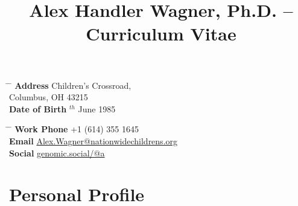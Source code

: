 \documentclass[10pt]{article} %
\begin{document}

\title{Alex Handler Wagner, Ph.D. -- Curriculum Vitae} %


\parbox{0.5\textwidth}{ %
\begin{tabbing} %
\hspace{3cm} \= \hspace{4cm} \= \kill %
{\bf Address}  Children's Crossroad,\\ %
\> Columbus, OH 43215 \\ %
{\bf Date of Birth} $^{th}$ June 1985 %
\end{tabbing}}
\hfill %
\parbox{0.5\textwidth}{ %
\begin{tabbing} %
\hspace{3cm} \= \hspace{4cm} \= \kill %
{\bf Work Phone} \> +1 (614) 355 1645 \\ %
{\bf Email} \> \href{mailto:Alex.Wagner@nationwidechildrens.org}{Alex.Wagner@nationwidechildrens.org} \\ %
{\bf Social} \> \href{https://genomic.social/@a}{genomic.social/@a}
 
\end{tabbing}}


\section{Personal Profile}
\end{document}
